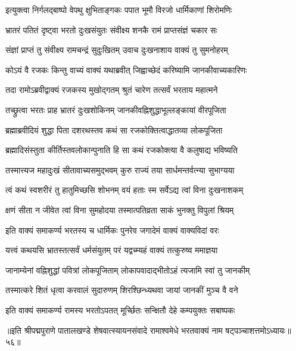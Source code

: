 \twolineshloka
{इत्युक्त्वा निर्गलद्बाष्पो वेपथु क्षुभिताङ्गकः}
{पपात भूमौ विरजो धार्मिकाणां शिरोमणिः}%

\twolineshloka
{भ्रातरं पतितं दृष्ट्वा भरतो दुःखसंयुतः}
{संवीक्ष्य शनकै रामं प्राप्तसंज्ञं चकार सः}%

\twolineshloka
{संज्ञां प्राप्तं तु संवीक्ष्य रामचन्द्रं सुदुःखितम्}
{उवाच दुःखनाशाय वाक्यं तु सुमनोहरम्}%

\twolineshloka
{कोऽयं वै रजकः किन्तु वाच्यं वाक्यं यथाब्रवीत्}
{जिह्वाच्छेदं करिष्यामि जानकीवाच्यकारिणः}%

\twolineshloka
{तदा रामोऽब्रवीद्वाक्यं रजकस्य मुखोद्गतम्}
{श्रुतं चारेण तत्सर्वं भरताय महात्मने}%

\twolineshloka
{तच्छ्रुत्वा भरतः प्राह भ्रातरं दुःखशोकिनम्}
{जानकीवह्निशुद्धाभूल्लङ्कायां वीरपूजिता}%

\twolineshloka
{ब्रह्माब्रवीदियं शुद्धा पिता दशरथस्तव}
{कथं सा रजकोक्तित्वाद्धातव्या लोकपूजिता}%

\twolineshloka
{ब्रह्मादिसंस्तुता कीर्तिस्तवलोकान्पुनाति हि}
{सा कथं रजकोक्त्या वै कलुषाद्य भविष्यति}%

\twolineshloka
{तस्मात्त्यज महादुःखं सीतावाच्यसमुद्भवम्}
{कुरु राज्यं तया सार्धमन्तर्वत्न्या सुभाग्यया}%

\twolineshloka
{त्वं कथं स्वशरीरं तु हातुमिच्छसि शोभनम्}
{वयं हताः स्म सर्वेऽद्य त्वां विना दुःखनाशकम्}%

\twolineshloka
{क्षणं सीता न जीवेत त्वां विना सुमहोदया}
{तस्मात्पतिव्रता साकं भुनक्तु विपुलां श्रियम्}%

\twolineshloka
{इति वाक्यं समाकर्ण्य भरतस्य च धार्मिकः}
{पुनरेव जगादेमं वाक्यं वाक्यविदां वरः}%

\twolineshloka
{यत्त्वं कथयसि भ्रातस्तत्सर्वं धर्मसंयुतम्}
{परं यद्वच्म्यहं वाक्यं तत्कुरुष्व ममाज्ञया}%

\twolineshloka
{जानाम्येनां वह्निशुद्धां पवित्रां लोकपूजिताम्}
{लोकापवादाद्भीतोऽहं त्यजामि स्वां तु जानकीम्}%

\twolineshloka
{तस्मात्करे शितं धृत्वा करवालं सुदारुणम्}
{शिरश्छिन्ध्यथवा जायां जानकीं मुञ्च वै वने}%

\twolineshloka
{इति वाक्यं समाकर्ण्य रामस्य भरतोऽपतत्}
{मूर्च्छितः सन्क्षितौ देहे कम्पयुक्तः सबाष्पकः}%

॥इति श्रीपद्मपुराणे पातालखण्डे शेषवात्स्यायनसंवादे रामाश्वमेधे भरतवाक्यं नाम षट्पञ्चाशत्तमोऽध्यायः॥५६॥




